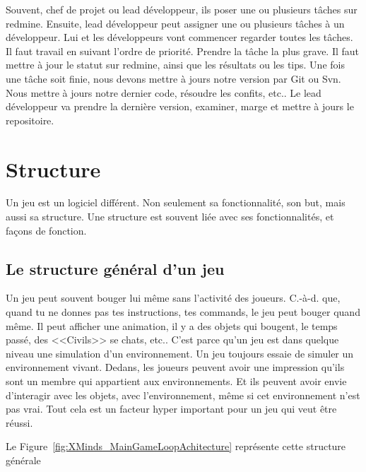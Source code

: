 Souvent, chef de projet ou lead développeur, ils poser une ou plusieurs tâches sur redmine. Ensuite, lead développeur peut assigner une ou plusieurs tâches à un développeur. Lui et les développeurs vont commencer regarder toutes les tâches. Il faut travail en suivant l'ordre de priorité. Prendre la tâche la plus grave. Il faut mettre à jour le statut sur redmine, ainsi que les résultats ou les tips. Une fois une tâche soit finie, nous devons mettre à jours notre version par Git ou Svn. Nous mettre à jours notre dernier code, résoudre les confits, etc.. Le lead développeur va prendre la dernière version, examiner, marge et mettre à jours le repositoire.




\section{Structure} %
\label{sec:structure}

Un jeu est un logiciel différent. Non seulement sa fonctionnalité, son but, mais aussi sa structure. Une structure est souvent liée avec ses fonctionnalités, et façons de fonction. 

\subsection{Le structure général d'un jeu} %
\label{sub:le_structure_général_d_un_jeu}

Un jeu peut souvent bouger lui même sans l'activité des joueurs. C.-à-d. que, quand tu ne donnes pas tes instructions, tes commands, le jeu peut bouger quand même. Il peut afficher une animation, il y a des objets qui bougent, le temps passé, des <<Civils>> se chats, etc.. C'est parce qu’un jeu est dans quelque niveau une simulation d'un environnement. Un jeu toujours essaie de simuler un environnement vivant. Dedans, les joueurs peuvent avoir une impression qu’ils sont un membre qui appartient aux environnements. Et ils peuvent avoir envie d’interagir avec les objets, avec l'environnement, même si cet environnement n'est pas vrai. Tout cela est un facteur hyper important pour un jeu qui veut être réussi.

Le Figure~\ref{fig:XMinds_MainGameLoopAchitecture} représente cette structure générale

